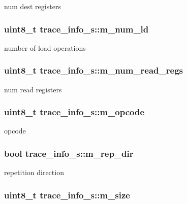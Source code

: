 \label{structtrace__info__s_a2d250544eb2d81da6b644b33101ef76e}
num dest registers \hypertarget{structtrace__info__s_aea4eee2fbd949de38c9df8645e061535}{
\subsubsection[{m\_\-num\_\-ld}]{\setlength{\rightskip}{0pt plus 5cm}uint8\_\-t {\bf trace\_\-info\_\-s::m\_\-num\_\-ld}}}
\label{structtrace__info__s_aea4eee2fbd949de38c9df8645e061535}
number of load operations \hypertarget{structtrace__info__s_aefe11a7ef0dab22fea0c6d7602938b67}{
\subsubsection[{m\_\-num\_\-read\_\-regs}]{\setlength{\rightskip}{0pt plus 5cm}uint8\_\-t {\bf trace\_\-info\_\-s::m\_\-num\_\-read\_\-regs}}}
\label{structtrace__info__s_aefe11a7ef0dab22fea0c6d7602938b67}
num read registers \hypertarget{structtrace__info__s_a1e2ea83d02f81c7d689163e0f208df0b}{
\subsubsection[{m\_\-opcode}]{\setlength{\rightskip}{0pt plus 5cm}uint8\_\-t {\bf trace\_\-info\_\-s::m\_\-opcode}}}
\label{structtrace__info__s_a1e2ea83d02f81c7d689163e0f208df0b}
opcode \hypertarget{structtrace__info__s_ae55a52d05ff80215a66e4d1634f7093b}{
\subsubsection[{m\_\-rep\_\-dir}]{\setlength{\rightskip}{0pt plus 5cm}bool {\bf trace\_\-info\_\-s::m\_\-rep\_\-dir}}}
\label{structtrace__info__s_ae55a52d05ff80215a66e4d1634f7093b}
repetition direction \hypertarget{structtrace__info__s_af246dd2207021ddead1cd63178952876}{
\subsubsection[{m\_\-size}]{\setlength{\rightskip}{0pt plus 5cm}uint8\_\-t {\bf trace\_\-info\_\-s::m\_\-size}}}
